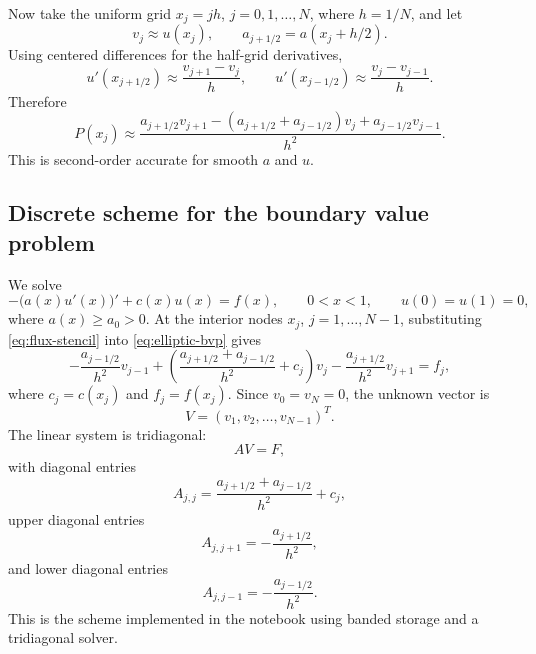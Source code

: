 \documentclass[11pt]{article}
\begin{document}
Now take the uniform grid $x_j=jh$, $j=0,1,\ldots,N$, where $h=1/N$, and let
\begin{equation}
    v_j \approx u(x_j), \qquad a_{j+1/2}=a(x_j+h/2).
\end{equation}
Using centered differences for the half-grid derivatives,
\begin{equation}
    u'(x_{j+1/2}) \approx \frac{v_{j+1}-v_j}{h},
    \qquad
    u'(x_{j-1/2}) \approx \frac{v_j-v_{j-1}}{h}.
\end{equation}
Therefore
\begin{equation}
    P(x_j)
    \approx
    \frac{
    a_{j+1/2}v_{j+1}
    -(a_{j+1/2}+a_{j-1/2})v_j
    +a_{j-1/2}v_{j-1}
    }{h^2}.
    \label{eq:flux-stencil}
\end{equation}
This is second-order accurate for smooth $a$ and $u$.

\subsection{Discrete scheme for the boundary value problem}

We solve
\begin{equation}
    -\bigl(a(x)u'(x)\bigr)' + c(x)u(x)=f(x),
    \qquad 0<x<1,
    \qquad u(0)=u(1)=0,
    \label{eq:elliptic-bvp}
\end{equation}
where $a(x)\ge a_0>0$.  At the interior nodes $x_j$, $j=1,\ldots,N-1$, substituting \eqref{eq:flux-stencil} into \eqref{eq:elliptic-bvp} gives
\begin{equation}
    -\frac{a_{j-1/2}}{h^2}v_{j-1}
    +\left(\frac{a_{j+1/2}+a_{j-1/2}}{h^2}+c_j\right)v_j
    -\frac{a_{j+1/2}}{h^2}v_{j+1}
    =
    f_j,
    \label{eq:fd-scheme}
\end{equation}
where $c_j=c(x_j)$ and $f_j=f(x_j)$.  Since $v_0=v_N=0$, the unknown vector is
\begin{equation}
    V=(v_1,v_2,\ldots,v_{N-1})^T.
\end{equation}
The linear system is tridiagonal:
\begin{equation}
    A V=F,
\end{equation}
with diagonal entries
\begin{equation}
    A_{j,j}=\frac{a_{j+1/2}+a_{j-1/2}}{h^2}+c_j,
\end{equation}
upper diagonal entries
\begin{equation}
    A_{j,j+1}=-\frac{a_{j+1/2}}{h^2},
\end{equation}
and lower diagonal entries
\begin{equation}
    A_{j,j-1}=-\frac{a_{j-1/2}}{h^2}.
\end{equation}
This is the scheme implemented in the notebook using banded storage and a tridiagonal solver.
\end{document}
